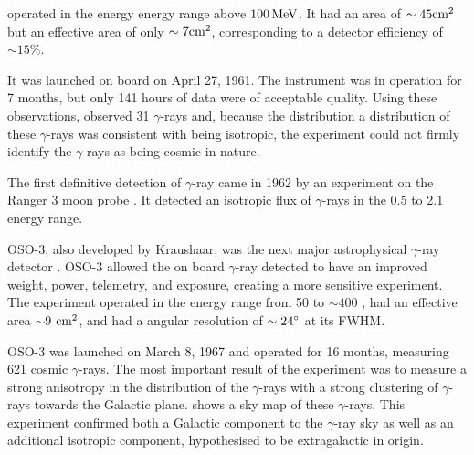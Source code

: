 \explorerxi operated in the energy energy range above $100\,\text{MeV}$.
It had an area of $\sim45\text{cm}^2$ but an effective area of only $\sim
7\text{cm}^2$, corresponding to a detector efficiency of $\sim 15\%$.

It was launched on board \explorerxi on April 27, 1961. The instrument
was in operation for 7 months, but only 141 hours of data were of
acceptable quality.  Using these observations, \explorerxi observed
31 $\gamma$-rays and, because the distribution a distribution of these
$\gamma$-rays was consistent with being isotropic, the experiment could
not firmly identify the $\gamma$-rays as being cosmic in nature.

The first definitive detection of $\gamma$-ray came in
1962 by an experiment on the Ranger 3 moon
probe \citep{arnold_1962_gamma-space}.  It detected an isotropic flux
of $\gamma$-rays in the 0.5 \mev to 2.1 \mev energy range.

\Ac{OSO-3}, also developed by Kraushaar, 
was the next major astrophysical $\gamma$-ray detector
\citep{kraushaar_1972_high-energy-cosmic}.  \Ac{OSO-3} 
allowed the on board $\gamma$-ray detected to have an improved weight,
power, telemetry, and exposure, creating a more sensitive experiment.
The experiment operated in the energy range from 50 \mev to $\sim 400$
\mev, had an effective area $\sim 9$ $\text{cm}^2$, and had a angular resolution of
$\sim 24^\circ$ at its \ac{FWHM}.

\Ac{OSO-3} was launched on March 8, 1967 and operated for 16 months, measuring
621 cosmic $\gamma$-rays.  The most important result of the experiment was
to measure a strong anisotropy in the distribution of the $\gamma$-rays
with a strong clustering of $\gamma$-rays towards the Galactic plane.
 shows a sky map of these $\gamma$-rays.  This
experiment confirmed both a Galactic component to the $\gamma$-ray
sky as well as an additional isotropic component, hypothesised to be
extragalactic in origin.

